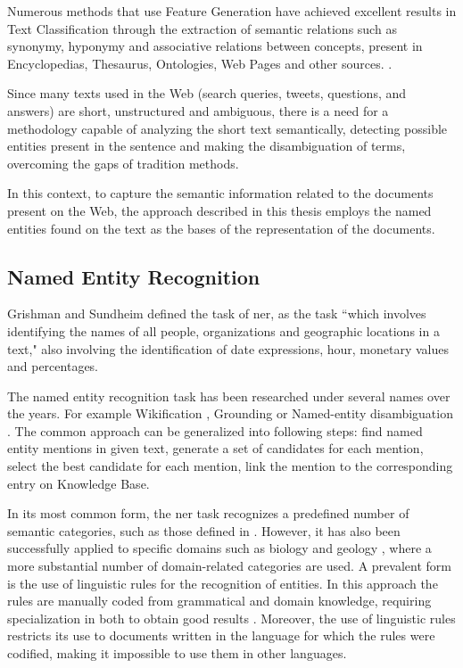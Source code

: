 Numerous methods that use Feature Generation have achieved excellent results in Text Classification through the extraction of semantic relations such as synonymy, hyponymy and associative relations between concepts, present in Encyclopedias, Thesaurus, Ontologies, Web Pages and other sources. \cite{Gabrilovich:2005,Gabrilovich:2006,Hu:2008,Wang:2008, Wang:2009}.

Since many texts used in the Web (search queries, tweets, questions, and answers) are short, unstructured and ambiguous, there is a need for a methodology capable of analyzing the short text semantically, detecting possible entities present in the sentence and making the disambiguation of terms, overcoming the gaps of tradition methods.

In this context, to capture the semantic information related to the documents present on the Web, the approach described in this thesis employs the named entities found on the text as the bases of the representation of the documents.


\subsection{\hspace*{3pt}Named Entity Recognition}

Grishman and  Sundheim \cite{grishman1996message} defined the task of \gls{ner}, as the task ``which involves identifying the names of all people, organizations and geographic locations in a text," also involving the identification of date expressions, hour, monetary values and percentages. 

The named entity recognition task has been researched under several names over the years. For example Wikification \cite{Ratinov:2011}, Grounding \cite{leidner2003grounding} or Named-entity disambiguation \cite{hoffart2011robust}. The common approach can be generalized into following steps: find named entity mentions in given text, generate a set of candidates for each mention, select the best candidate for each mention, link the mention to the corresponding entry on Knowledge Base.

In its most common form, the \gls{ner} task recognizes a predefined number of semantic categories, such as those defined in \cite{grishman1996message}. However, it has also been successfully applied to specific domains such as biology \cite{campos2012biomedical} and geology \cite{sobhana2010conditional}, where a more substantial number of domain-related categories are used. A prevalent form is the use of linguistic rules for the recognition of entities. In this approach the rules are manually coded from grammatical and domain knowledge, requiring specialization in both to obtain good results \cite{nadeau2007survey}. Moreover, the use of linguistic rules restricts its use to documents written in the language for which the rules were codified, making it impossible to use them in other languages.

